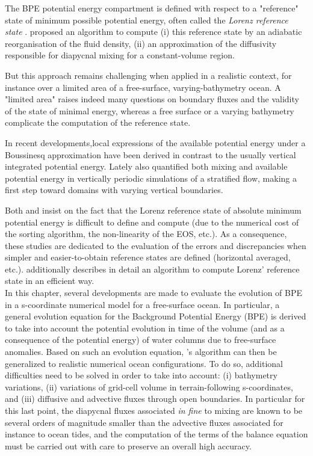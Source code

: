 The BPE potential energy compartment is defined with respect to a "reference" state of minimum possible potential energy, often called the \textit{Lorenz reference state} \citep{saenz_estimating_2015}. \cite{winters_available_1995} proposed an algorithm to compute (i) this reference state by an adiabatic reorganisation of the fluid density, (ii) an approximation of the diffusivity responsible for diapycnal mixing for a constant-volume region.


But this approach remains challenging when applied in a realistic context, for instance over a limited area of a free-surface, varying-bathymetry ocean. A "limited area" raises indeed many questions on boundary fluxes and the validity of the state of minimal energy, whereas a free surface or a varying bathymetry complicate the computation of the reference state.


In recent developments,local expressions of the available potential energy under a Boussinesq approximation have been derived \citep{winters_available_2013} in contrast to the usually vertical integrated potential energy. Lately \cite{howland_mixing_2020,howland_quantifying_2020} also quantified both mixing and available potential energy in vertically periodic simulations of a stratified flow, making a first step toward domains with varying vertical boundaries. 

Both \cite{saenz_estimating_2015} and \cite{tailleux_local_2018} insist on the fact that the Lorenz reference state of absolute minimum potential energy is difficult to define and compute (due to the numerical cost of the sorting algorithm, the non-linearity of the EOS, etc.). As a consequence, these studies are dedicated to the evaluation of the errors and discrepancies when simpler and easier-to-obtain reference states are defined (horizontal averaged, etc.).  \cite{saenz_estimating_2015} additionally describes in detail an algorithm to compute Lorenz' reference state in an efficient way.\\

In this chapter, several developments are made to evaluate the evolution of BPE in a s-coordinate numerical model for a free-surface ocean. In particular, a general evolution equation for the Background Potential Energy (BPE) is derived to take into account the potential evolution in time of the volume (and as a consequence of the potential energy) of water columns due to free-surface anomalies.
Based on such an evolution equation, \cite{winters_available_1995}'s algorithm can then be generalized to realistic numerical ocean configurations. To do so, additional difficulties need to be solved in order to take into account: (i) bathymetry variations, (ii) variations of grid-cell volume in terrain-following s-coordinates, and (iii) diffusive and advective fluxes through open boundaries. In particular for this last point, the diapycnal fluxes associated \textit{in fine} to mixing are known to be several orders of magnitude smaller than the advective fluxes associated for instance to ocean tides, and the computation of the terms of the balance equation must be carried out with care to preserve an overall high accuracy.

